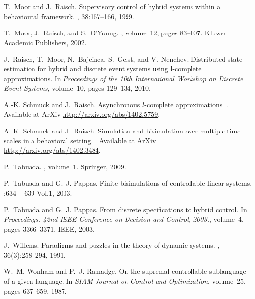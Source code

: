 \documentclass[letterpaper, 11 pt, onecolumn]{ieeeconf}
\newcommand{\0}{\ensuremath{\emptyset}}
\begin{document}
\begin{thebibliography}{10}

T.~Moor and J.~Raisch.
\newblock Supervisory control of hybrid systems within a behavioural framework.
, 38:157--166, 1999.

T.~Moor, J.~Raisch, and S.~O'Young.
, volume~12, pages 83--107.
\newblock Kluwer Academic Publishers, 2002.

J.~Raisch, T.~Moor, N.~Bajcinca, S.~Geist, and V.~Nenchev.
\newblock Distributed state estimation for hybrid and discrete event systems
  using l-complete approximations.
\newblock In {\em Proceedings of the 10th International Workshop on Discrete
  Event Systems}, volume~10, pages 129--134, 2010.

A.-K. Schmuck and J.~Raisch.
\newblock Asynchronous $l$-complete approximations.
.
\newblock Available at Ar{X}iv \url{http://arxiv.org/abs/1402.5759}.

A.-K. Schmuck and J.~Raisch.
\newblock Simulation and bisimulation over multiple time scales in a behavioral
  setting.
.
\newblock Available at Ar{X}iv \url{http://arxiv.org/abs/1402.3484}.

P.~Tabuada.
, volume~1.
\newblock Springer, 2009.

P.~Tabuada and G.~J. Pappas.
\newblock Finite bisimulations of controllable linear systems.
:634 -- 639 Vol.1, 2003.

P.~Tabuada and G.~J. Pappas.
\newblock From discrete specifications to hybrid control.
\newblock In {\em Proceedings. 42nd IEEE Conference on Decision and Control,
  2003.}, volume~4, pages 3366--3371. IEEE, 2003.

J.~Willems.
\newblock Paradigms and puzzles in the theory of dynamic systems.
, 36(3):258--294, 1991.

W.~M. Wonham and P.~J. Ramadge.
\newblock On the supremal controllable sublanguage of a given language.
\newblock In {\em SIAM Journal on Control and Optimization}, volume~25, pages
  637--659, 1987.

\end{thebibliography}
\end{document}
